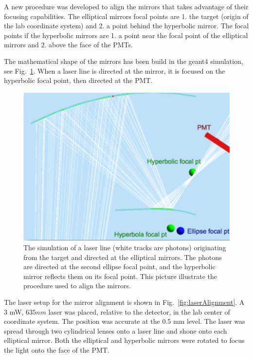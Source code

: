 A new procedure was developed to align the mirrors that takes advantage of their focusing capabilities. The elliptical mirrors focal points are 1. the target
(origin of the lab coordinate system)
and 2. a point behind the hyperbolic mirror. The focal points if the hyperbolic mirrors are 1. a point near the focal point of the elliptical mirrors and
2. above the face of the PMTs.

The mathematical shape of the mirrors has been build in the geant4 simulation, see Fig.~\ref{fig:alignmentSimulation}. When a laser line is directed at the mirror,
it is focused on the hyperbolic focal point, then directed at the PMT.

\begin{figure}[h]
\centering
	\includegraphics[width=1.0\columnwidth, keepaspectratio]{img/mirrorAlignmentSimulationZoomed.png}
	\caption{The simulation of a laser line (white tracks are photons) originating from the target and directed at the elliptical mirrors. The photons are directed
		      at the second ellipse focal point, and the hyperbolic mirror reflects them on its focal point. This picture illustrate the procedure used to align the mirrors.}
	\label{fig:alignmentSimulation}
\end{figure}

The laser setup for the mirror alignment is shown in Fig.~\ref{fig:laserAlignment}. A 3 mW, $635 nm$ laser was placed, relative to the detector,
in the lab center of coordinate system. The position was accurate at the 0.5 mm level. The laser was spread through two cylindrical lenses onto a laser line and shone
onto each elliptical mirror. Both the elliptical and hyperbolic mirrors were rotated to focus the light onto the face of the PMT.

